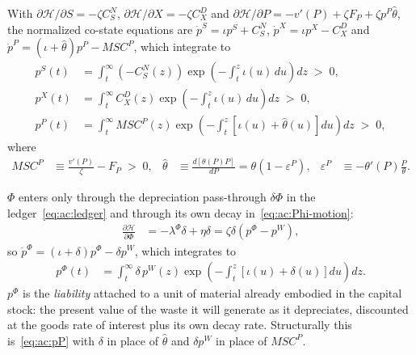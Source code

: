  With $\partial\mathcal H/\partial S=-\zeta C^N_S$, $\partial\mathcal H/\partial X=-\zeta C^D_X$ and $\partial\mathcal H/\partial P=-v'(P)+\zeta F_P+\zeta p^P\widehat\theta$, the normalized co-state equations are $\dot p^S=\iota p^S+C^N_S$, $\dot p^X=\iota p^X-C^D_X$ and $\dot p^P=\left(\iota+\widehat\theta\right)p^P-MSC^P$, which integrate to
\begin{align}
p^S(t) &= \int_t^{\infty}\left(-C^N_S(z)\right)\exp\left(-\int_t^{z}\iota(u)\,du\right)dz\;>\;0,
\label{eq:ac:pS}
\\
p^X(t) &= \int_t^{\infty}C^D_X(z)\exp\left(-\int_t^{z}\iota(u)\,du\right)dz\;>\;0,
\label{eq:ac:pX}
\\
p^P(t) &= \int_t^{\infty}MSC^P(z)\exp\left(-\int_t^{z}\left[\iota(u)+\widehat\theta(u)\right]du\right)dz\;>\;0,
\label{eq:ac:pP}
\end{align}
where
\begin{align}
MSC^P &\equiv \frac{v'(P)}{\zeta}-F_P\;>\;0,
&
\widehat\theta &\equiv \frac{d\left[\theta(P)P\right]}{dP}=\theta\left(1-\varepsilon^P\right),
&
\varepsilon^P &\equiv -\theta'(P)\frac{P}{\theta}.
\label{eq:ac:MSCP}
\end{align}

 $\Phi$ enters only through the depreciation pass-through $\delta\Phi$ in the ledger~\eqref{eq:ac:ledger} and through its own decay in~\eqref{eq:ac:Phi-motion}:
\begin{align}
\frac{\partial\mathcal H}{\partial\Phi} &= -\lambda^\Phi\delta+\eta\delta=\zeta\delta\left(p^\Phi-p^W\right),
\label{eq:ac:H-Phi}
\end{align}
so $\dot p^\Phi=\left(\iota+\delta\right)p^\Phi-\delta p^W$, which integrates to
\begin{align}
p^\Phi(t) &= \int_t^{\infty}\delta\,p^W(z)\exp\left(-\int_t^{z}\left[\iota(u)+\delta(u)\right]du\right)dz.
\label{eq:ac:pPhi}
\end{align}
$p^\Phi$ is the \emph{liability} attached to a unit of material already embodied in the capital stock: the present value of the waste it will generate as it depreciates, discounted at the goods rate of interest plus its own decay rate. Structurally this is~\eqref{eq:ac:pP} with $\delta$ in place of $\widehat\theta$ and $\delta p^W$ in place of $MSC^P$.

